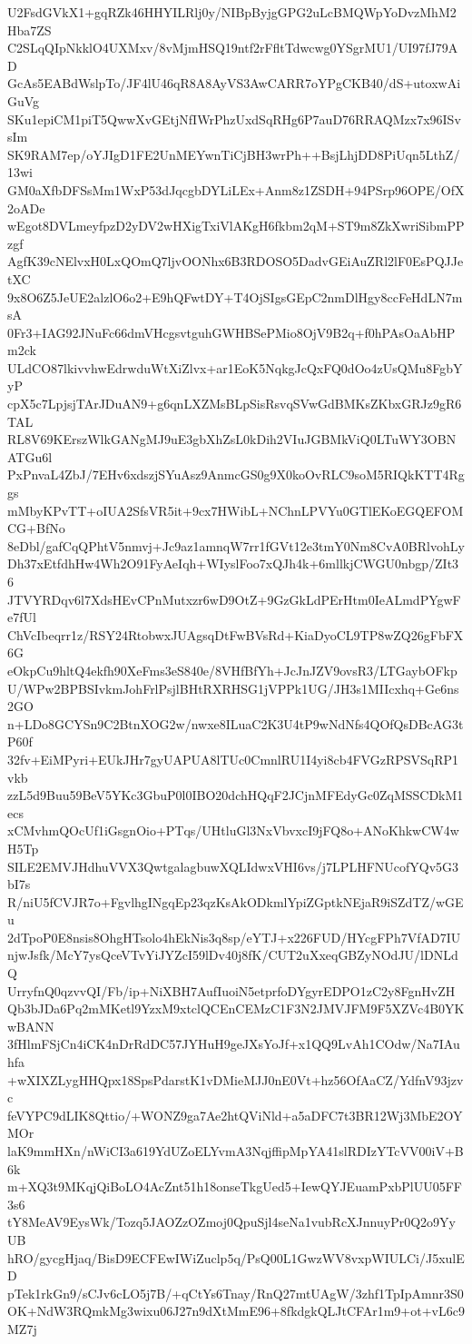 U2FsdGVkX1+gqRZk46HHYILRlj0y/NIBpByjgGPG2uLcBMQWpYoDvzMhM2Hba7ZS
C2SLqQIpNkklO4UXMxv/8vMjmHSQ19ntf2rFfltTdwcwg0YSgrMU1/UI97fJ79AD
GcAs5EABdWslpTo/JF4lU46qR8A8AyVS3AwCARR7oYPgCKB40/dS+utoxwAiGuVg
SKu1epiCM1piT5QwwXvGEtjNfIWrPhzUxdSqRHg6P7auD76RRAQMzx7x96ISvsIm
SK9RAM7ep/oYJIgD1FE2UnMEYwnTiCjBH3wrPh++BsjLhjDD8PiUqn5LthZ/13wi
GM0aXfbDFSsMm1WxP53dJqcgbDYLiLEx+Anm8z1ZSDH+94PSrp96OPE/OfX2oADe
wEgot8DVLmeyfpzD2yDV2wHXigTxiVlAKgH6fkbm2qM+ST9m8ZkXwriSibmPPzgf
AgfK39cNElvxH0LxQOmQ7ljvOONhx6B3RDOSO5DadvGEiAuZRl2lF0EsPQJJetXC
9x8O6Z5JeUE2alzlO6o2+E9hQFwtDY+T4OjSIgsGEpC2nmDlHgy8ccFeHdLN7msA
0Fr3+IAG92JNuFc66dmVHcgsvtguhGWHBSePMio8OjV9B2q+f0hPAsOaAbHPm2ck
ULdCO87lkivvhwEdrwduWtXiZlvx+ar1EoK5NqkgJcQxFQ0dOo4zUsQMu8FgbYyP
cpX5c7LpjsjTArJDuAN9+g6qnLXZMsBLpSisRsvqSVwGdBMKsZKbxGRJz9gR6TAL
RL8V69KErszWlkGANgMJ9uE3gbXhZsL0kDih2VIuJGBMkViQ0LTuWY3OBNATGu6l
PxPnvaL4ZbJ/7EHv6xdszjSYuAsz9AnmcGS0g9X0koOvRLC9soM5RIQkKTT4Rggs
mMbyKPvTT+oIUA2SfsVR5it+9cx7HWibL+NChnLPVYu0GTlEKoEGQEFOMCG+BfNo
8eDbl/gafCqQPhtV5nmvj+Jc9az1amnqW7rr1fGVt12e3tmY0Nm8CvA0BRlvohLy
Dh37xEtfdhHw4Wh2O91FyAeIqh+WIyslFoo7xQJh4k+6mllkjCWGU0nbgp/ZIt36
JTVYRDqv6l7XdsHEvCPnMutxzr6wD9OtZ+9GzGkLdPErHtm0IeALmdPYgwFe7fUl
ChVcIbeqrr1z/RSY24RtobwxJUAgsqDtFwBVsRd+KiaDyoCL9TP8wZQ26gFbFX6G
eOkpCu9hltQ4ekfh90XeFms3eS840e/8VHfBfYh+JcJnJZV9ovsR3/LTGaybOFkp
U/WPw2BPBSIvkmJohFrlPsjlBHtRXRHSG1jVPPk1UG/JH3s1MIIcxhq+Ge6ns2GO
n+LDo8GCYSn9C2BtnXOG2w/nwxe8ILuaC2K3U4tP9wNdNfs4QOfQsDBcAG3tP60f
32fv+EiMPyri+EUkJHr7gyUAPUA8lTUc0CmnlRU1I4yi8cb4FVGzRPSVSqRP1vkb
zzL5d9Buu59BeV5YKc3GbuP0l0IBO20dchHQqF2JCjnMFEdyGc0ZqMSSCDkM1ecs
xCMvhmQOcUf1iGsgnOio+PTqs/UHtluGl3NxVbvxcI9jFQ8o+ANoKhkwCW4wH5Tp
SILE2EMVJHdhuVVX3QwtgalagbuwXQLIdwxVHI6vs/j7LPLHFNUcofYQv5G3bI7s
R/niU5fCVJR7o+FgvlhgINgqEp23qzKsAkODkmlYpiZGptkNEjaR9iSZdTZ/wGEu
2dTpoP0E8nsis8OhgHTsolo4hEkNis3q8sp/eYTJ+x226FUD/HYcgFPh7VfAD7IU
njwJsfk/McY7ysQceVTvYiJYZcI59lDv40j8fK/CUT2uXxeqGBZyNOdJU/lDNLdQ
UrryfnQ0qzvvQI/Fb/ip+NiXBH7AufIuoiN5etprfoDYgyrEDPO1zC2y8FgnHvZH
Qb3bJDa6Pq2mMKetl9YzxM9xtclQCEnCEMzC1F3N2JMVJFM9F5XZVc4B0YKwBANN
3fHlmFSjCn4iCK4nDrRdDC57JYHuH9geJXsYoJf+x1QQ9LvAh1COdw/Na7IAuhfa
+wXIXZLygHHQpx18SpsPdarstK1vDMieMJJ0nE0Vt+hz56OfAaCZ/YdfnV93jzvc
feVYPC9dLIK8Qttio/+WONZ9ga7Ae2htQViNld+a5aDFC7t3BR12Wj3MbE2OYMOr
laK9mmHXn/nWiCI3a619YdUZoELYvmA3NqjffipMpYA41slRDIzYTcVV00iV+B6k
m+XQ3t9MKqjQiBoLO4AcZnt51h18onseTkgUed5+IewQYJEuamPxbPlUU05FF3s6
tY8MeAV9EysWk/Tozq5JAOZzOZmoj0QpuSjl4seNa1vubRcXJnnuyPr0Q2o9YyUB
hRO/gycgHjaq/BisD9ECFEwIWiZuclp5q/PsQ00L1GwzWV8vxpWIULCi/J5xulED
pTek1rkGn9/sCJv6cLO5j7B/+qCtYs6Tnay/RnQ27mtUAgW/3zhf1TpIpAmnr3S0
OK+NdW3RQmkMg3wixu06J27n9dXtMmE96+8fkdgkQLJtCFAr1m9+ot+vL6c9MZ7j
